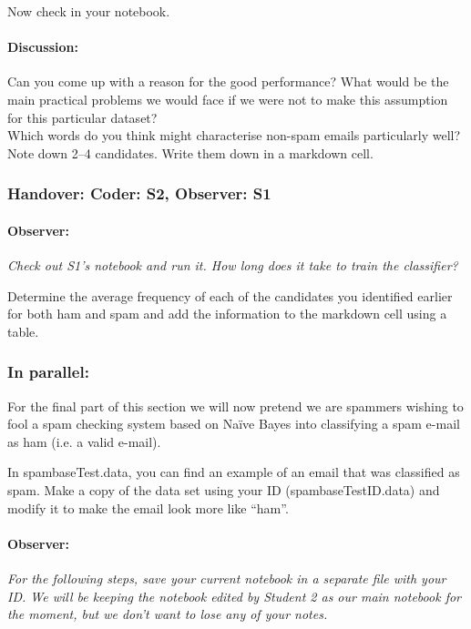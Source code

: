\documentclass{article}
\begin{document}
Now check in your notebook. 

\paragraph{Discussion:} Can you come up with a reason for the good performance? What would be the main practical problems we would face if we were not to make this assumption for this particular dataset?\\
Which words do you think might characterise non-spam emails particularly well? Note down 2--4 candidates. Write them down in a markdown cell. 


\subsubsection*{Handover: Coder: S2, Observer: S1}
\paragraph{Observer:} \emph{Check out S1's notebook and run it. How long does it take to train the classifier?}

Determine the average frequency of each of the candidates you identified earlier for both ham and spam and add the information to the markdown cell using a table. 


\subsubsection*{In parallel:}

For the final part of this section we will now pretend we are spammers wishing to fool a spam checking system based on Naïve Bayes into classifying a spam e-mail as ham (i.e. a valid e-mail). 

In spambaseTest.data, you can find an example of an email that was classified as spam. Make a copy of the data set using your ID (spambaseTestID.data) and modify it to make the email look more like ``ham''. 

\paragraph{Observer:} \emph{For the following steps, save your current notebook in a separate file with your ID. We will be keeping the notebook edited by Student 2 as our main notebook for the moment, but we don't want to lose any of your notes.}
\end{document}
